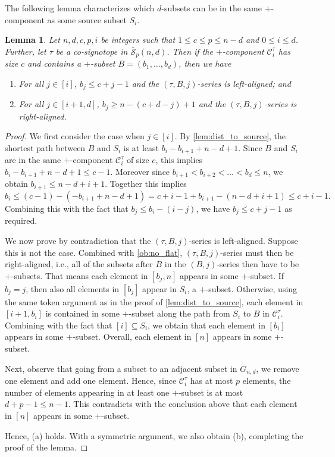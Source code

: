 \documentclass[a4paper,11pt]{amsart}
\newtheorem{lemma}[theorem]{Lemma}
\newcommand{\C}{\mathcal{C}}
\newcommand{\calS}{\mathcal{S}}
\begin{document}
The following lemma characterizes which $d$-subsets can be in the same $+$-component as some source subset $S_i$.

\begin{lemma}
\label{lem:one_source_index}
    Let $n,d,c,p,i$ be integers such that $1 \leq c \leq p \leq n-d$ and $0 \leq i \leq d$.
    Further, let $\tau$ be a co-signotope in $\bar{\calS}_{p}(n,d)$.
    Then if the $+$-component $\C^{\tau}_i$ has size $c$ and contains a $+$-subset $B = (b_1, \dots, b_d)$, then we have
    \begin{enumerate}[label=(\alph*)]
        \item For all $j \in [i]$, $b_j \leq c+j-1$ and the $(\tau,B,j)$-series is left-aligned; and
        \item For all $j \in [i+1,d]$, $b_j \geq n-(c+d-j)+1$ and the $(\tau,B,j)$-series is right-aligned.
    \end{enumerate}
\end{lemma}
\begin{proof}
    We first consider the case when $j \in [i]$.
    By \cref{lem:dist_to_source}, the shortest path between $B$ and $S_i$ is at least $b_i - b_{i+1} + n - d+1$.
    Since $B$ and $S_i$ are in the same $+$-component $\C^{\tau}_i$ of size $c$, this implies $b_i - b_{i+1} + n - d+1 \leq c-1$.
    Moreover since $b_{i+1} < b_{i+2} < \dots < b_d \leq n$, we obtain $b_{i+1} \leq n-d+i+1$.
    Together this implies
    \[
    	b_i \leq (c-1) - (- b_{i+1} + n - d+1) = c+i-1 + b_{i+1} - (n-d+i+1) \leq c+i-1.
    \]
    Combining this with the fact that $b_j \leq b_i - (i-j)$, we have $b_j \leq c+j-1$ as required.

    We now prove by contradiction that the $(\tau,B,j)$-series is left-aligned.
    Suppose this is not the case.
    Combined with \cref{ob:no_flat}, $(\tau,B,j)$-series must then be right-aligned, i.e., all of the subsets after $B$ in the $(B,j)$-series then have to be $+$-subsets.
    That means each element in $[b_j,n]$ appears in some $+$-subset.
    If $b_j = j$, then also all elements in $[b_j]$ appear in $S_i$, a $+$-subset.
    Otherwise, using the same token argument as in the proof of \cref{lem:dist_to_source}, each element in $[i+1,b_i]$ is contained in some $+$-subset along the path from $S_i$ to $B$ in $\C^{\tau}_i$.
    Combining with the fact that $[i] \subseteq S_i$, we obtain that each element in $[b_i]$ appears in some $+$-subset.
    Overall, each element in $[n]$ appears in some $+$-subset.

    Next, observe that going from a subset to an adjacent subset in $G_{n,d}$, we remove one element and add one element.
    Hence, since $\C^{\tau}_i$ has at most $p$ elements, the number of elements appearing in at least one $+$-subset is at most $d+p-1 \leq n-1$.
    This contradicts with the conclusion above that each element in $[n]$ appears in some $+$-subset.

    Hence, (a) holds.
    With a symmetric argument, we also obtain (b), completing the proof of the lemma.
\end{proof}
\end{document}
